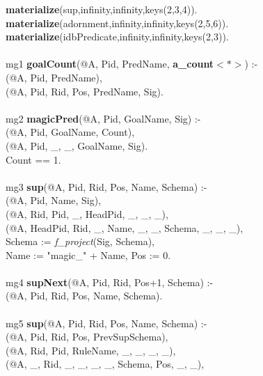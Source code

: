 \begin{figure}[t]
\ssp
\begin{boxedminipage}{\linewidth}
{\bf materialize}(sup,infinity,infinity,keys(2,3,4)). \\
{\bf materialize}(adornment,infinity,infinity,keys(2,5,6)). \\
{\bf materialize}(idbPredicate,infinity,infinity,keys(2,3)). \\
\\
mg1 {\small \bf goalCount}(@A, Pid, PredName, {\small \bf a\_count}$<*>$) :- \\
(@A, Pid, PredName), \\
(@A, Pid, Rid, Pos, PredName, Sig). \\
\\
mg2 {\small \bf magicPred}(@A, Pid, GoalName, Sig) :- \\
(@A, Pid, GoalName, Count), \\
(@A, Pid, \_, \_, GoalName, Sig). \\
\datalogspace Count == 1. \\
\\
mg3 {\small \bf sup}(@A, Pid, Rid, Pos, Name, Schema) :- \\
(@A, Pid, Name, Sig), \\
(@A, Rid, Pid, \_, HeadPid, \_, \_, \_), \\
(@A, HeadPid, Rid, \_, Name, \_, \_, Schema, \_, \_, \_), \\
\datalogspace Schema := {\em f\_project}(Sig, Schema), \\
\datalogspace Name := "magic\_" + Name, Pos := 0. \\
\\
mg4 {\small \bf supNext}(@A, Pid, Rid, Pos+1, Schema) :- \\
(@A, Pid, Rid, Pos, Name, Schema). \\
\\
mg5 {\small \bf sup}(@A, Pid, Rid, Pos, Name, Schema) :- \\
(@A, Pid, Rid, Pos, PrevSupSchema),\\
(@A, Rid, Pid, RuleName, \_, \_, \_, \_),\\
(@A, \_, Rid, \_, \_, \_, \_, Schema, Pos, \_, \_),\\

\end{boxedminipage}
\end{figure}
